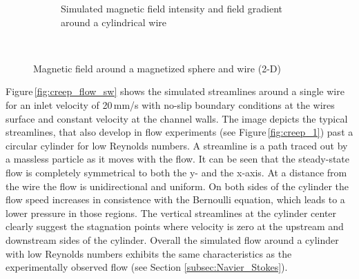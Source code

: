 \begin{figure}[H]
\begin{subfigure}{0.49\textwidth}
                \caption{Simulated magnetic field intensity and field gradient around a cylindrical wire \cite{lindner2013simulation}}\label{fig:mag_field_nirschl}
        \end{subfigure}
        \\
        
        \caption[Magnetic field around a magnetized sphere and wire]{Magnetic field around a magnetized sphere and wire (2-D)}
        \label{fig:esem_prax}
  \end{figure}

 
Figure\,\ref{fig:creep_flow_sw} shows the simulated streamlines around a single wire for an inlet velocity of 20\,mm/s with no-slip boundary conditions at the wires surface and constant velocity at the channel walls. The image depicts the typical streamlines, that also develop in flow experiments (see Figure\,\ref{fig:creep_1}) past a circular cylinder for low Reynolds numbers.  A streamline is a path traced out by a massless particle as it moves with the flow. It can be seen that the steady-state flow is completely symmetrical to both the y- and the x-axis. At a distance from the wire the flow is unidirectional and uniform. On both sides of the cylinder the flow speed increases in consistence with the Bernoulli equation, which leads to a lower pressure in those regions. The vertical streamlines at the cylinder center clearly suggest the stagnation points where velocity is zero at the upstream and downstream sides of the cylinder. Overall the simulated flow around a cylinder with low Reynolds numbers exhibits the same characteristics as the experimentally observed flow (see Section \ref{subsec:Navier_Stokes}). 
% 
% 
  
